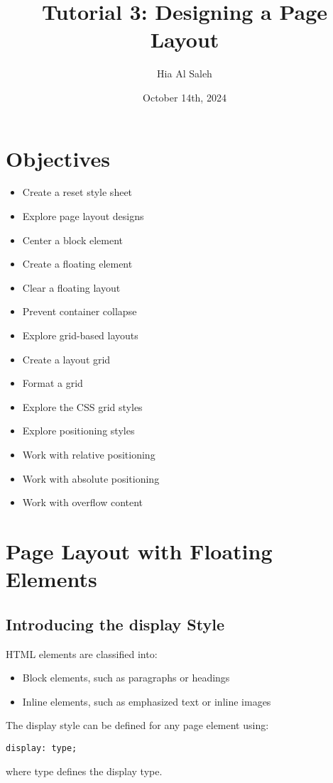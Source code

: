 \documentclass{article}
\title{Tutorial 3: Designing a Page Layout}
\author{Hia Al Saleh}
\date{October 14th, 2024}
\begin{document}
\maketitle
\tableofcontents
\newpage 

\section{Objectives}
\begin{itemize}
    \item Create a reset style sheet
    \item Explore page layout designs
    \item Center a block element
    \item Create a floating element
    \item Clear a floating layout
    \item Prevent container collapse
    \item Explore grid-based layouts
    \item Create a layout grid
    \item Format a grid
    \item Explore the CSS grid styles
    \item Explore positioning styles
    \item Work with relative positioning
    \item Work with absolute positioning
    \item Work with overflow content
\end{itemize}

\section{Page Layout with Floating Elements}
\subsection{Introducing the display Style}
HTML elements are classified into:
\begin{itemize}
    \item Block elements, such as paragraphs or headings
    \item Inline elements, such as emphasized text or inline images
\end{itemize}
The display style can be defined for any page element using:
\begin{lstlisting}
display: type;
\end{lstlisting}
where type defines the display type.
\end{document}
